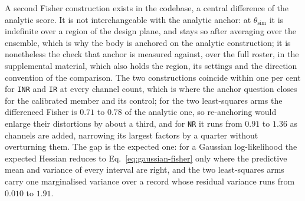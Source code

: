 A second Fisher construction exists in the codebase, a central difference of the
analytic score. It is not interchangeable with the analytic anchor: at
$\theta_{\mathrm{sim}}$ it is indefinite over a region of the design plane, and stays so after
averaging over the ensemble, which is why the body is anchored on the analytic construction; it is
nonetheless the check that anchor is measured against, over the full roster, in the supplemental material, which also holds the region, its settings and the direction convention of the comparison.
The two constructions coincide within one per cent for \texttt{INR} and \texttt{IR} at every
channel count, which is where the anchor question closes for the calibrated member and its
control; for the two least-squares arms the differenced Fisher is $0.71$ to $0.78$ of the analytic
one, so re-anchoring would enlarge their distortions by about a third, and for \texttt{NR} it runs
from $0.91$ to $1.36$ as channels are added, narrowing its largest factors by a quarter without
overturning them. The gap is the expected one: for a Gaussian log-likelihood the expected Hessian
reduces to Eq.~\ref{eq:gaussian-fisher} only where the predictive mean and variance of every
interval are right, and the two least-squares arms carry one marginalised variance over a record
whose residual variance runs from $0.010$ to $1.91$.
